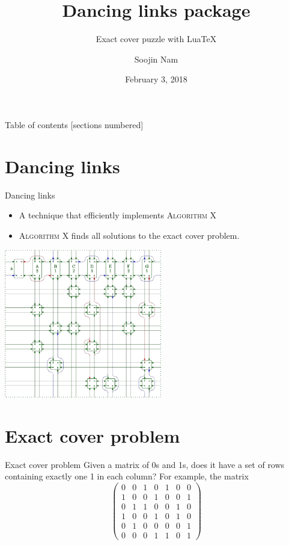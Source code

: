 \documentclass[xcolor=svgnames]{beamer}
\title{Dancing links package}
\subtitle{Exact cover puzzle with Lua\TeX }
\date{February 3, 2018}
\author{Soojin Nam}
\institute{The Korean \TeX\ Society}
\begin{document}
\maketitle

%
\begin{frame}{Table of contents}
  [sections numbered]
  \tableofcontents
\end{frame}


\section{Dancing links}

%
\begin{frame}{Dancing links}
  \begin{itemize}
  \item A technique that efficiently implements
    \textsc{Algorithm X}
  \item \textsc{Algorithm X} finds all solutions to
    the exact cover problem.
  \end{itemize}
  \centering\includegraphics[height=6.5cm]{imgs/cdance-4.png}
\end{frame}


\section{Exact cover problem}

%
\begin{frame}{Exact cover problem}
  Given a matrix of 0s and 1s, does it have a set of rows
  containing exactly one 1 in each column? For example, the matrix
  $$
  \left(\begin{array}{ccccccc}
    0&0&1&0&1&0&0\\
    1&0&0&1&0&0&1\\
    0&1&1&0&0&1&0\\
    1&0&0&1&0&1&0\\
    0&1&0&0&0&0&1\\
    0&0&0&1&1&0&1
  \end{array}\right)
  $$
\end{frame}
\end{document}
